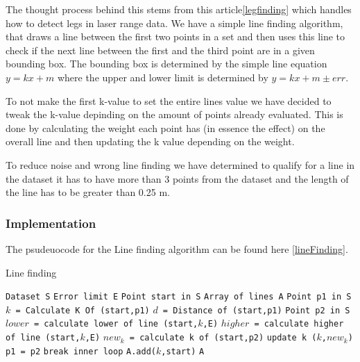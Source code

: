 \documentclass[a4paper, 10pt, conference]{ieeeconf}      %
\begin{document}
The thought process behind this stems from this article\ref{legfinding} which handles how to detect legs in laser range data. We have a simple line finding algorithm, that draws a line between the first two points in a set and then uses this line to check if the next line between the first and the third point are in a given bounding box. The bounding box is determined by the simple line equation $y = kx + m$ where the upper and lower limit is determined by $y = kx + m \pm err$. 

To not make the first k-value to set the entire lines value we have decided to tweak the k-value depinding on the amount of points already evaluated. This is done by calculating the weight each point has (in essence the effect) on the overall line and then updating the k value depending on the weight.

To reduce noise and wrong line finding we have determined to qualify for a line in the dataset it has to have more than 3 points from the dataset and the length of the line has to be greater than 0.25 m.
\subsubsection{Implementation}
The psudeuocode for the Line finding algorithm can be found here \ref{lineFinding}.

\begin{algorithm}
  \caption{Line finding}\label{LineFinding}
  \begin{algorithmic}[1]
      \State \texttt{Dataset S}
      \State \texttt{Error limit E}
      \State \texttt{Point start in S}
      \State \texttt{Array of lines A}
      	\State \texttt{Point p1 in S}
      	\State \texttt{$k$ = Calculate K Of (start,p1)}
      	\State \texttt{$d$ = Distance of (start,p1)}
      		\State \texttt{Point p2 in S}
      		\State \texttt{$lower$ = calculate lower of line (start,$k$,E)}
      		\State \texttt{$higher$ = calculate higher of line (start,$k$,E)}
      			\State \texttt{$new_k$ = calculate k of (start,p2)}
      			\State \texttt{update k ($k$,$new_k$)}
      			\State \texttt{p1 = p2}
      		\Else
      			\State \texttt{break inner loop}
      		\EndIf
      	\EndWhile
      		\State \texttt{A.add($k$,start)}
      	\EndIf
      \EndWhile
      \Return \texttt{A}
  \end{algorithmic}
\end{algorithm}
\end{document}
